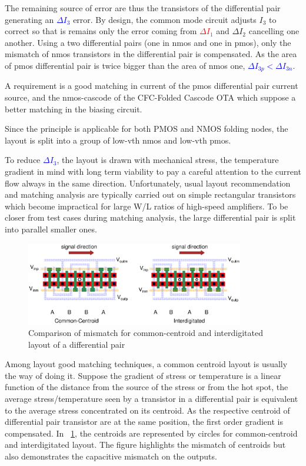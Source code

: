 The remaining source of error are thus the transistors of the differential pair generating an \textcolor{blue}{\(\Delta I_3\)} error. By design, the common mode circuit adjusts \(I_3\) to correct so that is remains only the error coming from \textcolor{red}{\(\Delta I_1\)} and \textcolor{Xgreen}{\(\Delta I_2\)} cancelling one another. Using a two differential pairs (one in nmos and one in pmos), only the mismatch of nmos transistors in the differential pair is compensated. As the area of pmos differential pair is twice bigger than the area of nmos one, \textcolor{blue}{\(\Delta I_{3p} < \Delta I_{3n}\)}.

A requirement is a good matching in current of the pmos differential pair current source, and the nmos-cascode of the CFC-Folded Cascode OTA which suppose a better matching in the biasing circuit.

Since the principle is applicable for both PMOS and NMOS folding nodes, the layout is split into a group of low-vth nmos and low-vth pmos.

To reduce \textcolor{blue}{\(\Delta I_3\)}, the layout is drawn with mechanical stress, the temperature gradient in mind with long term viability to pay a careful attention to the current flow always in the same direction. Unfortunately, usual layout recommendation and matching analysis are typically carried out on simple rectangular transistors which become impractical for large W/L ratios of high-speed amplifiers. To be closer from test cases during matching analysis, the large differential pair is split into parallel smaller ones.

\begin{figure}[htp]
    \centering
    \includegraphics[width=0.85\textwidth]{Chapter7/Figs/common-centroi-vs-interdigitated.ps}
    \caption{Comparison of mismatch for common-centroid and interdigitated layout of a differential pair}
    \label{fig:common-centroid-vs-interdigitated}
\end{figure}

Among layout good matching techniques, a common centroid layout is usually the way of doing it. Suppose the gradient of stress or temperature is a linear function of the distance from the source of the stress or from the hot spot, the average stress/temperature seen by a transistor in a differential pair is equivalent to the average stress concentrated on its centroid. As the respective centroid of differential pair transistor are at the same position, the first order gradient is compensated. In \figurename~\ref{fig:common-centroid-vs-interdigitated}, the centroids are represented by circles for common-centroid and interdigitated layout.
The figure highlights the mismatch of centroids but also demonstrates the capacitive mismatch on the outputs.

